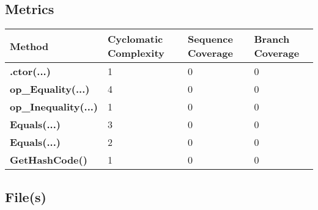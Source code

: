 \documentclass[a4paper,10pt]{article}
\begin{document}
\subsection{Metrics}
\begin{longtable}[l]{|l|l|l|l|}
\hline
\textbf{Method} & \textbf{Cyclomatic Complexity} & \textbf{Sequence Coverage} & \textbf{Branch Coverage}\\
\hline
\textbf{.ctor(...)} & 1 & 0 & 0\\
\hline
\textbf{op\_Equality(...)} & 4 & 0 & 0\\
\hline
\textbf{op\_Inequality(...)} & 1 & 0 & 0\\
\hline
\textbf{Equals(...)} & 3 & 0 & 0\\
\hline
\textbf{Equals(...)} & 2 & 0 & 0\\
\hline
\textbf{GetHashCode()} & 1 & 0 & 0\\
\hline
\end{longtable}
\subsection{File(s)}
\end{document}
